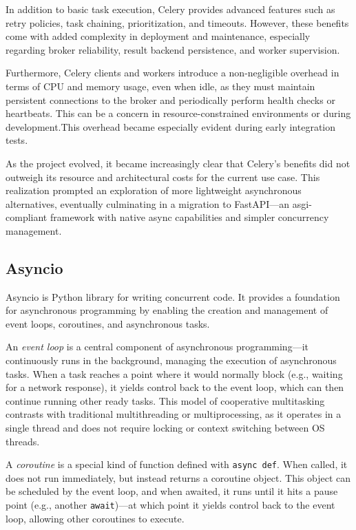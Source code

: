 In addition to basic task execution, Celery provides advanced features such as retry policies, task chaining, prioritization, 
and timeouts. However, these benefits come with added complexity in deployment and maintenance, especially regarding broker 
reliability, result backend persistence, and worker supervision.

Furthermore, Celery clients and workers introduce a non-negligible overhead in terms of CPU and memory usage, even when 
idle, as they must maintain persistent connections to the broker and periodically perform health checks or heartbeats. 
This can be a concern in resource-constrained environments or during development.This overhead became especially evident 
during early integration tests.

As the project evolved, it became increasingly clear that Celery's benefits did not outweigh its resource and 
architectural costs for the current use case. This realization prompted an exploration of more lightweight asynchronous 
alternatives, eventually culminating in a migration to FastAPI—an \ac{asgi}-compliant framework with native async capabilities 
and simpler concurrency management.

\subsection{Asyncio}

Asyncio is Python library for writing concurrent code. It provides a foundation for asynchronous programming by enabling 
the creation and management of event loops, coroutines, and asynchronous tasks.

An \textit{event loop} is a central component of asynchronous programming—it continuously runs in the background, managing 
the execution of asynchronous tasks. When a task reaches a point where it would normally block (e.g., waiting for a network 
response), it yields control back to the event loop, which can then continue running other ready tasks. This model of 
cooperative multitasking contrasts with traditional multithreading or multiprocessing, as it operates in a single thread 
and does not require locking or context switching between OS threads.

A \textit{coroutine} is a special kind of function defined with \texttt{async def}. When called, it does not run immediately, 
but instead returns a coroutine object. This object can be scheduled by the event loop, and when awaited, it runs until it 
hits a pause point (e.g., another \texttt{await})—at which point it yields control back to the event loop, allowing other 
coroutines to execute.

